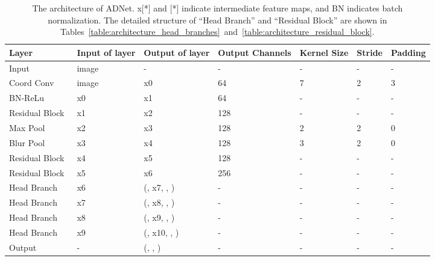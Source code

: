 \documentclass[10pt,twocolumn,letterpaper]{article}
\begin{document}
\begin{table*}[htbp]
\centering
\small
\begin{subtable}
\centering
\begin{tabular}{|p{0.95in}|p{0.85in}|p{1.5in}|p{1.0in}|p{0.5in}|p{0.5in}|p{0.5in}|}
\hline
Layer & Input of layer & Output of layer & Output Channels & Kernel Size & Stride & Padding \\
\hline
Input & image & - & - & - & - & - \\
\hline
Coord Conv~\cite{liu2018intriguing} & image & x0 & 64 & 7 & 2 & 3 \\
BN-ReLu & x0 & x1 & 64 & - & - & - \\
Residual Block~\cite{he2016deep} & x1 & x2 & 128 & - & - & - \\
Max Pool & x2 & x3 & 128 & 2 & 2 & 0 \\
Blur Pool~\cite{zhang2019making} & x3 & x4 & 128 & 3 & 2 & 0 \\
Residual Block & x4 & x5 & 128 & - & - & - \\
Residual Block & x5 & x6 & 256 & - & - & - \\
\hline
Head Branch & x6 & (, x7, , ) & - & - & - & - \\
Head Branch & x7 & (, x8, , ) & - & - & - & - \\
Head Branch & x8 & (, x9, , ) & - & - & - & - \\
Head Branch & x9 & (, x10, , ) & - & - & - & - \\
\hline
Output & - & (, , ) & - & - & - & - \\
\hline
\end{tabular}
\caption{The architecture of ADNet. x[*] and [*] indicate intermediate feature maps, and BN indicates batch normalization. The detailed structure of ``Head Branch'' and ``Residual Block'' are shown in Tables~\ref{table:architecture_head_branches}~and~\ref{table:architecture_residual_block}.}
\label{table:architecture_ADNet}
\end{subtable}

\hfill
\bigskip
\break


\end{table*}
\end{document}
